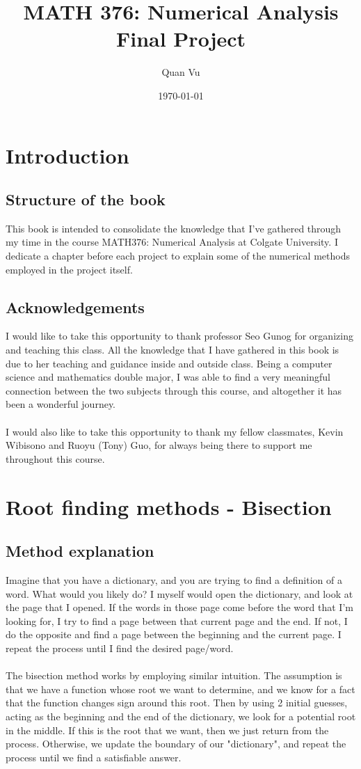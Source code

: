 \documentclass[openany]{book}
\title{%
	MATH 376: Numerical Analysis \\
	\large  Final Project
	}
\author{Quan Vu}
\date{\today}
\begin{document}
	\maketitle
	\chapter{Introduction}
	\section{Structure of the book}
	This book is intended to consolidate the knowledge that I've gathered through my time in the course MATH376: Numerical Analysis at Colgate University. I dedicate a chapter before each project to explain some of the numerical methods employed in the project itself.
	\section{Acknowledgements}
	I would like to take this opportunity to thank professor Seo Gunog for organizing and teaching this class. All the knowledge that I have gathered in this book is due to her teaching and guidance inside and outside class. Being a computer science and mathematics double major, I was able to find a very meaningful connection between the two subjects through this course, and altogether it has been a wonderful journey.\\\\
	I would also like to take this opportunity to thank my fellow classmates, Kevin Wibisono and Ruoyu (Tony) Guo, for always being there to support me throughout this course.  
	\chapter{Root finding methods - Bisection}
	\section{Method explanation}
	Imagine that you have a dictionary, and you are trying to find a definition of a word. What would you likely do? I myself would open the dictionary, and look at the page that I opened. If the words in those page come before the word that I'm looking for, I try to find a page between that current page and the end. If not, I do the opposite and find a page between the beginning and the current page. I repeat the process until I find the desired page/word.\\\\
	The bisection method works by employing similar intuition. The assumption is that we have a function whose root we want to determine, and we know for a fact that the function changes sign around this root. Then by using 2 initial guesses, acting as the beginning and the end of the dictionary, we look for a potential root in the middle. If this is the root that we want, then we just return from the process. Otherwise, we update the boundary of our "dictionary", and repeat the process until we find a satisfiable answer.
\end{document}
